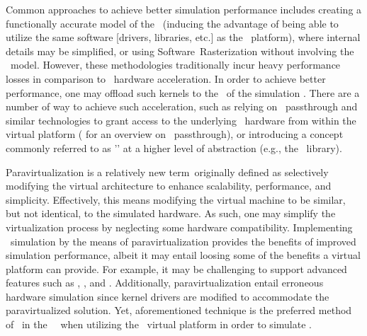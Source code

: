 Common approaches to achieve better simulation performance includes creating a functionally accurate model of the \termgpu\ (inducing the advantage of being able to utilize the same software [drivers, libraries, etc.] as the \termhost\ platform), where internal details may be simplified, or using Software~Rasterization without involving the \termgpu\ model.
However, these methodologies traditionally incur heavy performance losses in comparison to \termgpu\ hardware acceleration.
In order to achieve better performance, one may offload such kernels to the \termgpu\ of the simulation \termhost .
There are a number of way to achieve such acceleration, such as relying on \termpci ~passthrough and similar technologies to grant access to the underlying \termhost\ hardware from within the virtual platform ( for an overview on \termpci ~passthrough), or introducing a concept commonly referred to as '\termparavirtualization ' at a higher level of abstraction (e.g., the \termopengl\ library).


Paravirtualization is a relatively new term\ originally defined as selectively modifying the virtual architecture to enhance scalability, performance, and simplicity.
Effectively, this means modifying the virtual machine to be similar, but not identical, to the simulated hardware.
As such, one may simplify the virtualization process by neglecting some hardware compatibility.
Implementing \termgpu\ simulation by the means of paravirtualization provides the benefits of improved simulation performance, albeit it may entail loosing some of the benefits a virtual platform can provide.
For example, it may be challenging to support advanced features such as \termdetexe , \termcheckpointing , and \termrevexe .
Additionally, paravirtualization entail erroneous hardware simulation since kernel drivers are modified to accommodate the paravirtualized solution.  
Yet, aforementioned technique is the preferred method of \termgoogle\ in the \termandroid ~\termsdk\ when utilizing the \termqemu\ virtual platform in order to simulate \termopengles.\\

